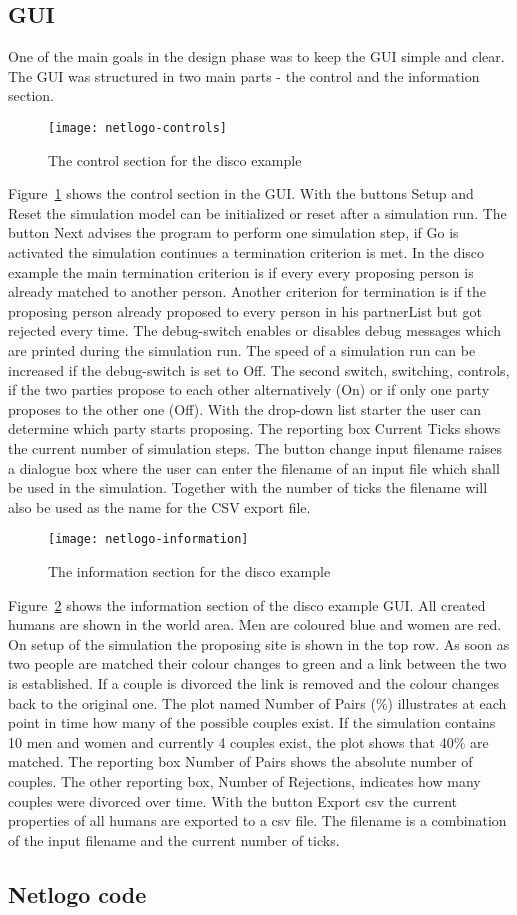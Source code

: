 \subsection{GUI}
One of the main goals in the design phase was to keep the GUI simple and clear.
The GUI was structured in two main parts - the control and the information section.
\begin{figure}[H]
  \caption{The control section for the disco example}
	\label{fig:control-disco-gui}
  \centering
    \texttt{[image: netlogo-controls]}
\end{figure}
Figure~\ref{fig:control-disco-gui} shows the control section in the GUI. 
With the buttons Setup and Reset the simulation model can be initialized or reset after a simulation run.
The button Next advises the program to perform one simulation step, if Go is activated the simulation continues a termination criterion is met.
In the disco example the main termination criterion is if every every proposing person is already matched to another person. 
Another criterion for termination is if the proposing person already proposed to every person in his partnerList but got rejected every time.
The debug-switch enables or disables debug messages which are printed during the simulation run.
The speed of a simulation run can be increased if the debug-switch is set to Off.
The second switch, switching, controls, if the two parties propose to each other alternatively (On) or if only one party proposes to the other one (Off).
With the drop-down list starter the user can determine which party starts proposing.
The reporting box Current Ticks shows the current number of simulation steps.
The button change input filename raises a dialogue box where the user can enter the filename of an input file which shall be used in the simulation.
Together with the number of ticks the filename will also be used as the name for the CSV export file.
\begin{figure}[H]
  \caption{The information section for the disco example}
	\label{fig:info-disco-gui}
  \centering
    \texttt{[image: netlogo-information]}
\end{figure}
Figure~\ref{fig:info-disco-gui} shows the information section of the disco example GUI. 
All created humans are shown in the world area. 
Men are coloured blue and women are red.
On setup of the simulation the proposing site is shown in the top row. 
As soon as two people are matched their colour changes to green and a link between the two is established.
If a couple is divorced the link is removed and the colour changes back to the original one.
The plot named Number of Pairs (\%) illustrates at each point in time how many of the possible couples exist. 
If the simulation contains 10 men and women and currently 4 couples exist, the plot shows that 40\% are matched.
The reporting box Number of Pairs shows the absolute number of couples.
The other reporting box, Number of Rejections, indicates how many couples were divorced over time.
With the button Export csv the current properties of all humans are exported to a csv file.
The filename is a combination of the input filename and the current number of ticks.

\subsection{Netlogo code}
